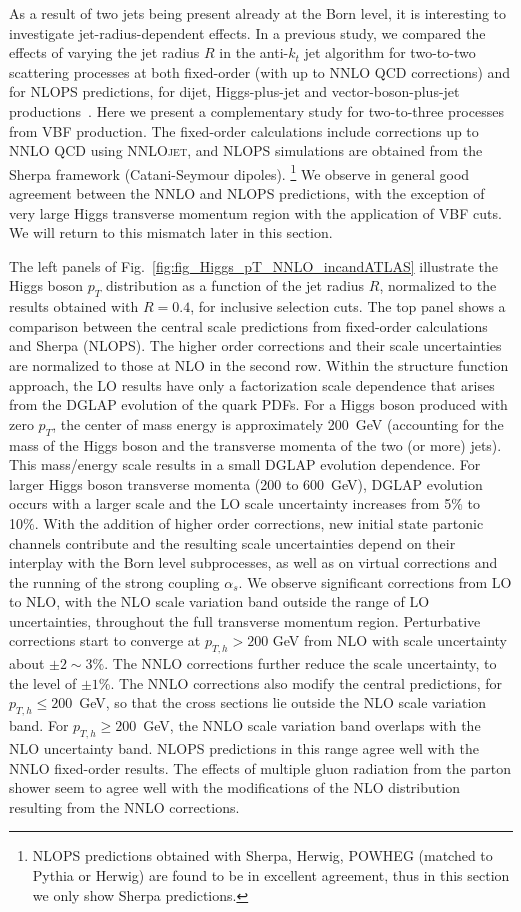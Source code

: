 \documentclass[10pt,prd,fleqn,superscriptaddress,notitlepage,nofootinbib,preprintnumbers,nobalancelastpage]{revtex4-1}
\newcommand{\NNLOJET}{\textsc{NNLOjet}\xspace}
\newcommand{\VBF}{VBF\xspace}
\begin{document}
As a result of two jets being present already at the Born level, it is interesting to investigate jet-radius-dependent effects.
In a previous study, we compared the effects of varying the jet radius $R$ in the anti-$k_t$ jet algorithm for two-to-two scattering processes at both fixed-order (with up to NNLO QCD corrections) and for NLOPS predictions,  for dijet, Higgs-plus-jet and vector-boson-plus-jet productions~\cite{Bellm:2019yyh}. Here we present a complementary study for two-to-three processes from \VBF production.
The fixed-order calculations include corrections up to NNLO QCD  using \NNLOJET, and NLOPS simulations are obtained from the Sherpa framework (Catani-Seymour dipoles).%
\footnote{NLOPS predictions obtained with Sherpa, Herwig, POWHEG (matched to Pythia or Herwig) are found to be in excellent agreement, thus in this section we only show Sherpa predictions.}
We observe in general good agreement between  the NNLO and NLOPS predictions,  with the exception of very large Higgs transverse momentum region with the application of VBF cuts. We will return to this mismatch later in this section.

The left panels of Fig.~\ref{fig:fig_Higgs_pT_NNLO_incandATLAS} illustrate the Higgs boson $p_T$ distribution as a function of the jet radius $R$, normalized to the results obtained with $R=0.4$, for inclusive selection cuts. The top panel shows a comparison between the central scale predictions from fixed-order calculations and Sherpa (NLOPS). The
higher order corrections and their scale uncertainties are normalized to those at NLO in the second row. Within the structure function approach, the LO results  have only a factorization scale dependence that arises from the DGLAP evolution of the quark PDFs. For a  Higgs boson produced with zero $p_T$, the center of mass energy is approximately 200~GeV (accounting for  the mass of the Higgs boson and the transverse momenta of the two (or more) jets). This mass/energy scale results in a small DGLAP evolution dependence.
For larger Higgs boson transverse momenta (200 to 600~GeV),  DGLAP evolution occurs  with a larger scale and the LO scale uncertainty increases from 5\% to 10\%.  With the addition of  higher order corrections, new initial state partonic channels  contribute and the resulting scale uncertainties depend on their interplay with the Born level subprocesses,  as well as on virtual corrections and the running of the strong coupling $\alpha_s$. We observe significant corrections from LO to NLO, with the NLO scale variation band outside the range of LO uncertainties, throughout the full transverse momentum region. Perturbative corrections start to converge at $p_{T,h}>200$ GeV from NLO with scale uncertainty about $\pm2\sim 3\%$. The NNLO corrections further reduce the scale uncertainty, to the level of $\pm 1$\%. The NNLO corrections also modify the central predictions, for $p_{T,h}\le 200$~GeV, so that the cross sections lie outside the NLO scale variation band. For $p_{T,h}\ge 200$~GeV, the NNLO scale variation band overlaps with the NLO uncertainty band. NLOPS predictions in this range  agree well with the NNLO fixed-order results. The effects of multiple gluon radiation from the parton shower seem to agree well with  the modifications of the NLO distribution resulting from the NNLO corrections.
\end{document}
